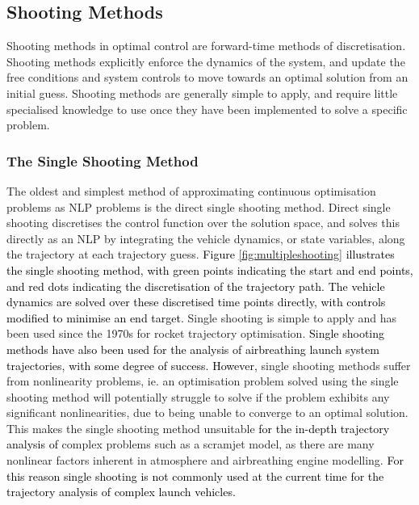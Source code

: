 \subsection{Shooting Methods}
Shooting methods in optimal control are forward-time methods of discretisation\cite{Kelly2015}. Shooting methods explicitly enforce the dynamics of the system, and update the free conditions and system controls to move towards an optimal solution from an initial guess\cite{Kelly2015}. Shooting methods are generally simple to apply, and require little specialised knowledge to use once they have been implemented to solve a specific problem. 


\subsubsection{The Single Shooting Method}
The oldest and simplest method of approximating continuous optimisation problems as NLP problems is the direct single shooting method. Direct single shooting discretises the control function over the solution space, and solves this directly as an NLP by integrating the vehicle dynamics, or state variables, along the trajectory at each trajectory guess\cite{Betts1998,Kelly2015,Rao2009,Fasano2013}. \textcolor{black}{Figure \ref{fig:multipleshooting} illustrates the single shooting method, with green points indicating the start and end points, and red dots indicating the discretisation of the trajectory path. The vehicle dynamics are solved over these discretised time points directly, with controls modified to minimise an end target.} Single shooting is simple to apply and has been used since the 1970s for rocket trajectory optimisation\cite{jezewski1971}. \textcolor{black}{Single shooting methods have also been used for the analysis of airbreathing launch system trajectories, with some degree of success\cite{Powell1991,Bradford2000,Hyperion,Bradford2002,Fujikawa2017}. However,} single shooting methods suffer from nonlinearity problems, ie. an optimisation problem solved using the single shooting method will potentially struggle to solve if the problem exhibits any significant nonlinearities, due to being unable to converge to an optimal solution. This makes the single shooting method unsuitable \textcolor{black}{for the in-depth trajectory analysis of} complex problems such as a scramjet model, as there are many nonlinear factors inherent in atmosphere and airbreathing engine modelling. \textcolor{black}{For this reason single shooting is not commonly used at the current time for the trajectory analysis of complex launch vehicles.}


